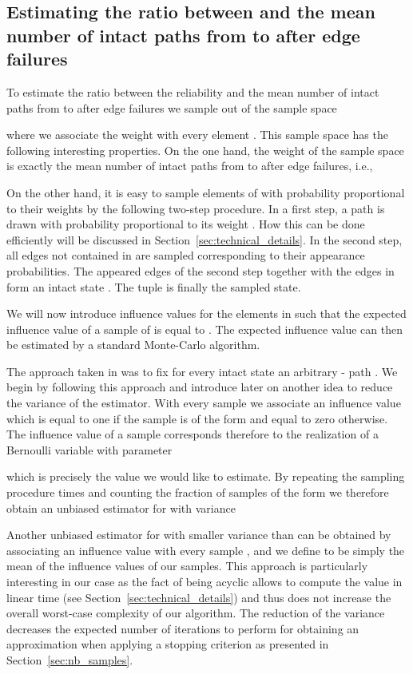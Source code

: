 \documentclass{article}
\begin{document}
\subsection{Estimating the ratio between
\texorpdfstring{{}}{} and the mean number of intact paths from
\texorpdfstring{{} to {}}{ to } after edge
failures}



To estimate the ratio between the reliability and the mean number
of intact paths from  to  after edge failures we
sample out of the sample space

where we associate the weight  with every element .
This sample space has the following
interesting properties. On the one hand, the weight of the sample
space is exactly the mean number of intact paths from  to 
after edge failures, i.e.,

On the other hand, it is easy to sample
elements of  with probability proportional to their
weights by the following two-step procedure.
In a first step, a path  is drawn
with probability proportional to its weight . How this
can be done efficiently will be discussed in
Section~\ref{sec:technical_details}. In the second step,
all edges not contained in  are sampled corresponding to their
appearance probabilities. The appeared edges of the second step together
with the edges in  form an intact state . The tuple
 is finally the sampled state.

We will now introduce influence values for the elements in 
such that the expected influence value of a sample of  is
equal to . The expected influence value
can then be estimated by a standard \mbox{Monte-Carlo} algorithm.

The approach taken in \cite{karp_1985_montecarlo} was to fix for every intact
state  an arbitrary - path . We begin by following this approach and
introduce later on another idea to reduce the
variance of the estimator. With every sample we associate an
influence value which
is equal to one if the sample is of the form 
and equal to zero otherwise. The influence value of a sample
corresponds therefore
to the realization of a Bernoulli variable with parameter

which is precisely the value we would like to estimate. By repeating the sampling procedure
 times and counting the fraction of samples of the
form  we therefore obtain an unbiased estimator 
for  with variance


Another unbiased estimator  for 
with smaller variance than  can be
obtained by associating an influence value
 with every sample
, and we define
 to be simply the mean of the influence values
of our samples. This
approach is particularly interesting in our case as the fact
of  being acyclic allows to compute the value
 in linear time (see Section~\ref{sec:technical_details})
and thus does not increase the overall worst-case complexity of our
algorithm. The reduction of the variance decreases the expected number
of iterations to perform for obtaining an  approximation
when applying a stopping criterion as presented in
Section~\ref{sec:nb_samples}.
\end{document}
